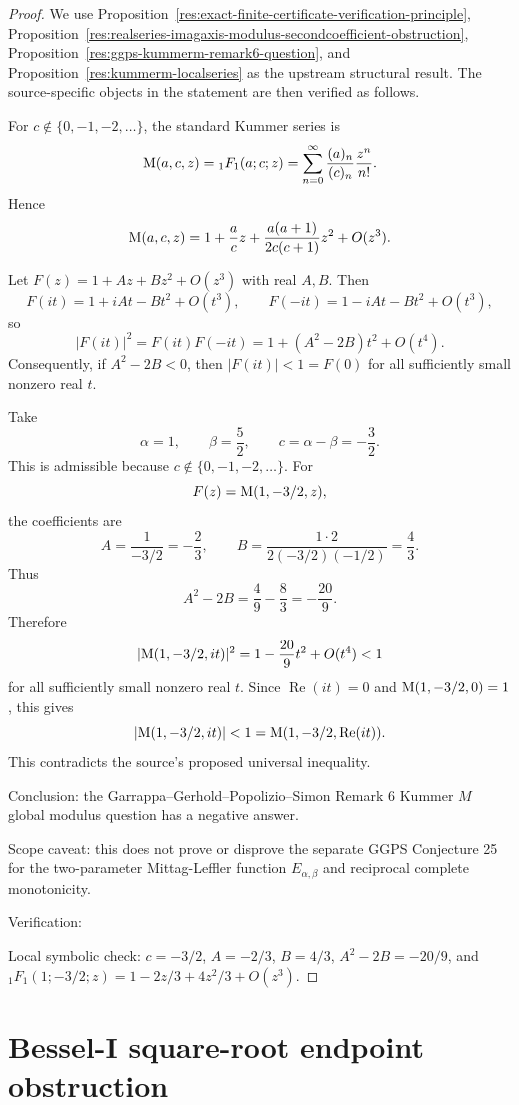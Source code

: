 \documentclass[11pt]{article}
\numberwithin{equation}{section}
\theoremstyle{definition}
\theoremstyle{remark}
\newcommand{\1}{\mathbf 1}
\begin{document}
\begin{proof}
We use Proposition~\ref{res:exact-finite-certificate-verification-principle}, Proposition~\ref{res:realseries-imagaxis-modulus-secondcoefficient-obstruction}, Proposition~\ref{res:ggps-kummerm-remark6-question}, and Proposition~\ref{res:kummerm-localseries} as the upstream structural result. The source-specific objects in the statement are then verified as follows.

For \(c\notin\{0,-1,-2,\ldots\}\), the standard Kummer series is
\[
{\rm M}(a,c,z)={}_1F_1(a;c;z)
=\sum_{n=0}^{\infty}\frac{(a)_n}{(c)_n}\frac{z^n}{n!}.
\]
Hence
\[
{\rm M}(a,c,z)
=1+\frac{a}{c}z+\frac{a(a+1)}{2c(c+1)}z^2+O(z^3).
\]

Let \(F(z)=1+Az+Bz^2+O(z^3)\) with real \(A,B\). Then
\[
F(it)=1+iAt-Bt^2+O(t^3),\qquad F(-it)=1-iAt-Bt^2+O(t^3),
\]
so
\[
|F(it)|^2=F(it)F(-it)=1+(A^2-2B)t^2+O(t^4).
\]
Consequently, if \(A^2-2B<0\), then \(|F(it)|<1=F(0)\) for all sufficiently small nonzero real \(t\).

Take
\[
\alpha=1,\qquad \beta=\frac52,\qquad c=\alpha-\beta=-\frac32.
\]
This is admissible because \(c\notin\{0,-1,-2,\ldots\}\). For
\[
F(z)={\rm M}(1,-3/2,z),
\]
the coefficients are
\[
A=\frac{1}{-3/2}=-\frac23,
\qquad
B=\frac{1\cdot2}{2(-3/2)(-1/2)}=\frac43.
\]
Thus
\[
A^2-2B=\frac49-\frac83=-\frac{20}{9}.
\]
Therefore
\[
|{\rm M}(1,-3/2,it)|^2=1-\frac{20}{9}t^2+O(t^4)<1
\]
for all sufficiently small nonzero real \(t\). Since \(\operatorname{Re}(it)=0\) and \({\rm M}(1,-3/2,0)=1\), this gives
\[
|{\rm M}(1,-3/2,it)|<1={\rm M}(1,-3/2,\operatorname{Re}(it)).
\]
This contradicts the source's proposed universal inequality.

Conclusion: the Garrappa--Gerhold--Popolizio--Simon Remark 6 Kummer \(M\) global modulus question has a negative answer.

Scope caveat: this does not prove or disprove the separate GGPS Conjecture 25 for the two-parameter Mittag-Leffler function \(E_{\alpha,\beta}\) and reciprocal complete monotonicity.

Verification:

Local symbolic check: \(c=-3/2\), \(A=-2/3\), \(B=4/3\), \(A^2-2B=-20/9\), and \({}_1F_1(1;-3/2;z)=1-2z/3+4z^2/3+O(z^3)\).
\end{proof}

\section{Bessel-I square-root endpoint obstruction}
\label{sec:bessel-i-square-root-endpoint-obstruction}
\end{document}
